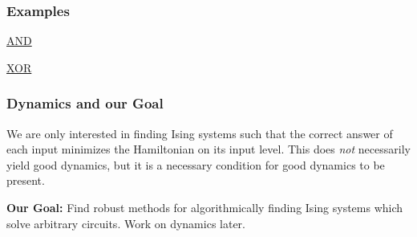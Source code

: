 \documentclass[8pt, mathserif, notheorems]{beamer}
\begin{document}
\begin{frame}[t]\frametitle{Examples}
  \begin{minipage}{0.49\textwidth}
  \begin{center}
    \Large \underline{AND}
  \end{center}
  \end{minipage}
  \begin{minipage}{0.49\textwidth}
  \begin{center}
    \Large \underline{XOR}
  \end{center}  
  \end{minipage}
\end{frame}
\begin{frame}[c]\frametitle{Dynamics and our Goal}
  We are only interested in finding Ising systems such that the correct answer of each input minimizes the Hamiltonian on its input level. This does \textit{not} necessarily yield good dynamics, but it is a necessary condition for good dynamics to be present.

  \bigskip

 \textbf{Our Goal:} Find robust methods for algorithmically finding Ising systems which solve arbitrary circuits. Work on dynamics later.
\end{frame}
\end{document}
